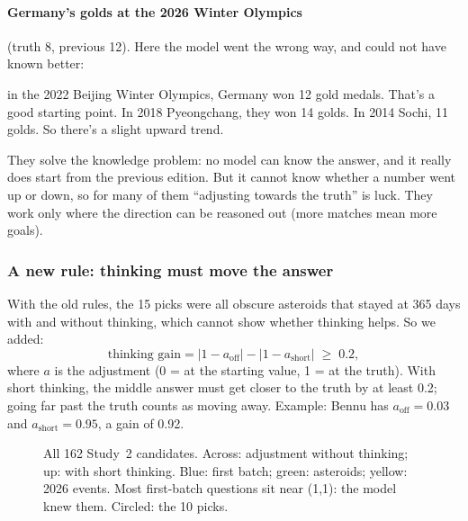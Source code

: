 \documentclass[11pt,a4paper]{article}
\begin{document}
\paragraph{Germany's golds at the 2026 Winter Olympics} (truth 8, previous 12). Here the model went the wrong way, and could not have known better:
\begin{transcript}
\cut{} in the 2022 Beijing Winter Olympics, Germany won 12 gold medals. That's a good starting point. \cut{} In 2018 Pyeongchang, they won 14 golds. In 2014 Sochi, 11 golds. So there's a slight upward trend. \cut{}
\end{transcript}

\begin{keybox}
They solve the knowledge problem: no model can know the answer, and it really does start from the previous edition. But it cannot know whether a number went up or down, so for many of them \enquote{adjusting towards the truth} is luck. They work only where the direction can be reasoned out (more matches mean more goals).
\end{keybox}

\subsubsection{A new rule: thinking must move the answer}
With the old rules, the 15 picks were all obscure asteroids that stayed at 365 days with and without thinking, which cannot show whether thinking helps. So we added:
\[ \text{thinking gain} = |1 - a_{\text{off}}| - |1 - a_{\text{short}}| \;\geq\; 0.2, \]
where $a$ is the adjustment (0 = at the starting value, 1 = at the truth). With short thinking, the middle answer must get closer to the truth by at least 0.2; going far past the truth counts as moving away. Example: Bennu has $a_{\text{off}} = 0.03$ and $a_{\text{short}} = 0.95$, a gain of 0.92.

\begin{figure}[ht]
\centering{}
\caption{All 162 Study~2 candidates. Across: adjustment without thinking; up: with short thinking. Blue: first batch; green: asteroids; yellow: 2026 events. Most first-batch questions sit near (1,1): the model knew them. Circled: the 10 picks.}
\end{figure}
\end{document}
